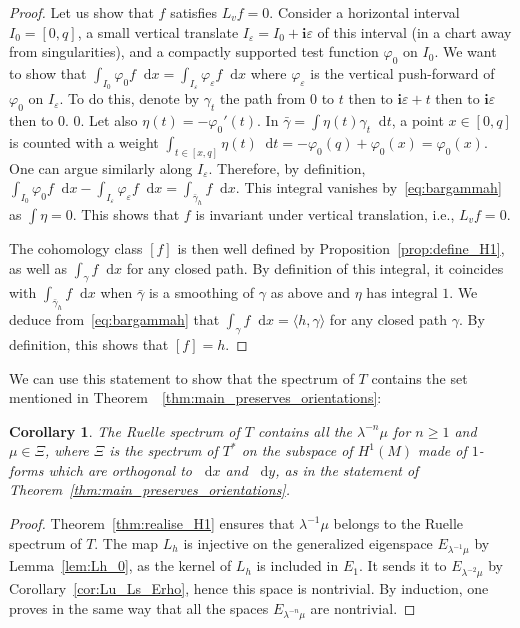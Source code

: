 \documentclass[11pt, a4paper, oneside, final, pagebackref]{amsart}
\newcommand{\dd}{\mathop{}\!\mathrm{d}}
\newcommand{\ic}{\mathbf{i}}
\renewcommand{\epsilon}{\varepsilon}
\renewcommand{\phi}{\varphi}
\renewcommand{\geq}{\geqslant}
\newtheorem{cor}[thm]{Corollary}
\theoremstyle{definition}
\numberwithin{equation}{section}
\begin{document}
\begin{proof}
Let us show that $f$ satisfies $L_v f = 0$. Consider a horizontal interval
$I_0 = [0, q]$, a small vertical translate $I_\epsilon = I_0+\ic \epsilon$ of
this interval (in a chart away from singularities), and a compactly supported
test function $\phi_0$ on $I_0$. We want to show that $\int_{I_0} \phi_0 f
\dd x = \int_{I_\epsilon} \phi_\epsilon f \dd x$ where $\phi_\epsilon$ is the
vertical push-forward of $\phi_0$ on $I_\epsilon$. To do this, denote by
$\gamma_t$ the path from $0$ to $t$ then to $\ic \epsilon+t$ then to
$\ic\epsilon$ then to $0$. $0$. Let also $\eta(t) = -\phi_0'(t)$. In
$\bar\gamma=\int \eta(t) \gamma_t \dd t$, a point $x \in [0,q]$ is counted
with a weight $\int_{t \in [x,q]} \eta(t) \dd t = -\phi_0(q) + \phi_0(x) =
\phi_0(x)$. One can argue similarly along $I_\epsilon$. Therefore, by
definition, $\int_{I_0} \phi_0 f \dd x - \int_{I_\epsilon} \phi_\epsilon f
\dd x = \int_{\bar \gamma_h} f \dd x$. This integral vanishes
by~\eqref{eq:bargammah} as $\int \eta=0$. This shows that $f$ is invariant
under vertical translation, i.e., $L_v f = 0$.

The cohomology class $[f]$ is then well defined by
Proposition~\ref{prop:define_H1}, as well as $\int_\gamma f \dd x$ for any
closed path. By definition of this integral, it coincides with
$\int_{\bar\gamma_h} f \dd x$ when $\bar\gamma$ is a smoothing of $\gamma$ as
above and $\eta$ has integral $1$. We deduce from~\eqref{eq:bargammah} that
$\int_\gamma f \dd x= \langle h, \gamma \rangle$ for any closed path
$\gamma$. By definition, this shows that $[f] = h$.
\end{proof}

We can use this statement to show that the spectrum of $T$ contains the set
mentioned in Theorem~~\ref{thm:main_preserves_orientations}:

\begin{cor}
\label{cor:spectre_contient} The Ruelle spectrum of $T$ contains all the
$\lambda^{-n} \mu$ for $n\geq 1$ and $\mu \in \Xi$, where $\Xi$ is the
spectrum of $T^*$ on the subspace of $H^1(M)$ made of $1$-forms which are
orthogonal to $\dd x$ and $\dd y$, as in the statement of
Theorem~\ref{thm:main_preserves_orientations}.
\end{cor}
\begin{proof}
Theorem~\ref{thm:realise_H1} ensures that $\lambda^{-1} \mu$ belongs to the
Ruelle spectrum of $T$. The map $L_h$ is injective on the generalized
eigenspace $E_{\lambda^{-1}\mu}$ by Lemma~\ref{lem:Lh_0}, as the kernel of
$L_h$ is included in $E_1$. It sends it to $E_{\lambda^{-2}\mu}$ by
Corollary~\ref{cor:Lu_Ls_Erho}, hence this space is nontrivial. By induction,
one proves in the same way that all the spaces $E_{\lambda^{-n}\mu}$ are
nontrivial.
\end{proof}
\end{document}
